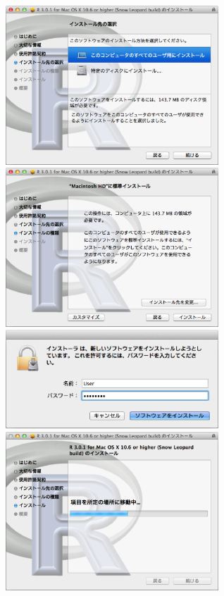 \documentclass[a4paper,10pt,fleqn]{jarticle}
\begin{document}
\includegraphics[width=8cm]{img/osx/osx006.eps}\hspace{0.8em} \includegraphics[width=8cm]{img/osx/osx007.eps}\\

\includegraphics[width=8cm]{img/osx/osx008.eps}\hspace{0.8em} \includegraphics[width=8cm]{img/osx/osx009.eps}\\
\end{document}
